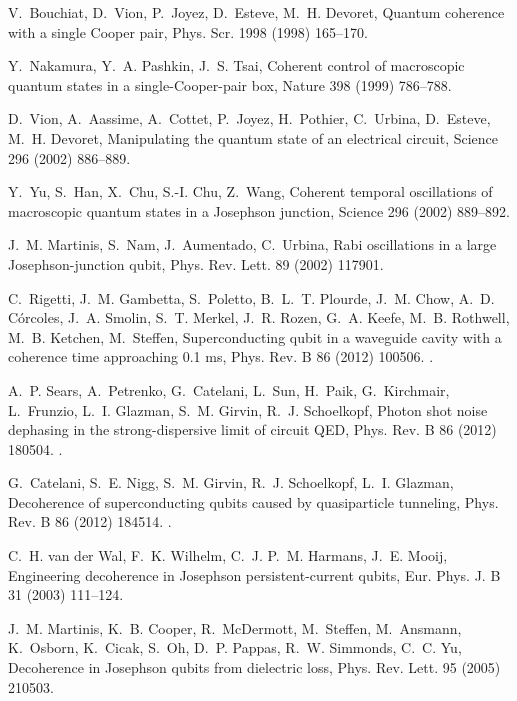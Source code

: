 \documentclass[3p,sort&compress]{elsarticle}
\begin{document}
\begin{thebibliography}{100}
V.~Bouchiat, D.~Vion, P.~Joyez, D.~Esteve, M.~H. Devoret, Quantum coherence
  with a single {C}ooper pair, Phys. Scr. 1998 (1998) 165--170.

Y.~Nakamura, Y.~A. Pashkin, J.~S. Tsai, Coherent control of macroscopic quantum
  states in a single-{C}ooper-pair box, Nature 398 (1999) 786--788.

D.~Vion, A.~Aassime, A.~Cottet, P.~Joyez, H.~Pothier, C.~Urbina, D.~Esteve,
  M.~H. Devoret, Manipulating the quantum state of an electrical circuit,
  Science 296 (2002) 886--889.

Y.~Yu, S.~Han, X.~Chu, S.-I. Chu, Z.~Wang, Coherent temporal oscillations of
  macroscopic quantum states in a {J}osephson junction, Science 296 (2002)
  889--892.

J.~M. Martinis, S.~Nam, J.~Aumentado, C.~Urbina, Rabi oscillations in a large
  {J}osephson-junction qubit, Phys. Rev. Lett. 89 (2002) 117901.

C.~Rigetti, J.~M. Gambetta, S.~Poletto, B.~L.~T. Plourde, J.~M. Chow, A.~D.
  C\'orcoles, J.~A. Smolin, S.~T. Merkel, J.~R. Rozen, G.~A. Keefe, M.~B.
  Rothwell, M.~B. Ketchen, M.~Steffen, Superconducting qubit in a waveguide
  cavity with a coherence time approaching 0.1 ms, Phys. Rev. B 86 (2012)
  100506.
\newblock \href {http://dx.doi.org/10.1103/PhysRevB.86.100506}
  {}.

A.~P. Sears, A.~Petrenko, G.~Catelani, L.~Sun, H.~Paik, G.~Kirchmair,
  L.~Frunzio, L.~I. Glazman, S.~M. Girvin, R.~J. Schoelkopf, Photon shot noise
  dephasing in the strong-dispersive limit of circuit {QED}, Phys. Rev. B 86
  (2012) 180504.
\newblock \href {http://dx.doi.org/10.1103/PhysRevB.86.180504}
  {}.

G.~Catelani, S.~E. Nigg, S.~M. Girvin, R.~J. Schoelkopf, L.~I. Glazman,
  Decoherence of superconducting qubits caused by quasiparticle tunneling,
  Phys. Rev. B 86 (2012) 184514.
\newblock \href {http://dx.doi.org/10.1103/PhysRevB.86.184514}
  {}.

C.~H. {van der Wal}, F.~K. Wilhelm, C.~J. P.~M. Harmans, J.~E. Mooij,
  Engineering decoherence in {J}osephson persistent-current qubits, Eur. Phys.
  J. B 31 (2003) 111--124.

J.~M. Martinis, K.~B. Cooper, R.~McDermott, M.~Steffen, M.~Ansmann, K.~Osborn,
  K.~Cicak, S.~Oh, D.~P. Pappas, R.~W. Simmonds, C.~C. Yu, Decoherence in
  {J}osephson qubits from dielectric loss, Phys. Rev. Lett. 95 (2005) 210503.


\end{thebibliography}
\end{document}
